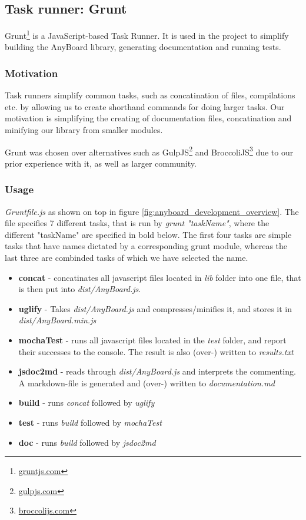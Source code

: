 \subsection{Task runner: Grunt}
Grunt\footnote{\href{http://gruntjs.com/}{gruntjs.com}} is a JavaScript-based Task Runner. It is used in the project to simplify building the AnyBoard library, generating documentation and running tests.

\subsubsection{Motivation}
Task runners simplify common tasks, such as concatination of files, compilations etc. by allowing us to create shorthand commands for doing larger tasks. Our motivation is simplifying the creating of documentation files, concatination and minifying our library from smaller modules. 

Grunt was chosen over alternatives such as GulpJS\footnote{\href{http://gulpjs.com/}{gulpjs.com}} and BroccoliJS\footnote{\href{http://broccolijs.com/}{broccolijs.com}} due to our prior experience with it, as well as larger community.

\subsubsection{Usage}
\emph{Gruntfile.js} as shown on top in figure \ref{fig:anyboard_development_overview}. The file specifies 7 different tasks, that is run by \emph{grunt "taskName"}, where the different "taskName" are specified in bold below. The first four tasks are simple tasks that have names dictated by a corresponding grunt module, whereas the last three are combinded tasks of which we have selected the name.

\begin{itemize}
\item \textbf{concat} - concatinates all javascript files located in \emph{lib} folder into one file, that is then put into \emph{dist/AnyBoard.js}.
\item \textbf{uglify} - Takes \emph{dist/AnyBoard.js} and compresses/minifies it, and stores it in \emph{dist/AnyBoard.min.js}
\item \textbf{mochaTest} - runs all javascript files located in the \emph{test} folder, and report their successes to the console. The result is also (over-) written to \emph{results.txt}
\item \textbf{jsdoc2md} - reads through \emph{dist/AnyBoard.js} and interprets the commenting. A markdown-file is generated and (over-) written to \emph{documentation.md}
\item \textbf{build} - runs \emph{concat} followed by \emph{uglify}
\item \textbf{test} - runs \emph{build} followed by \emph{mochaTest}
\item \textbf{doc} - runs \emph{build} followed by \emph{jsdoc2md}
\end{itemize}

